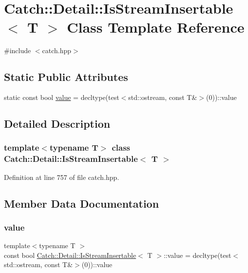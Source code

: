 \hypertarget{class_catch_1_1_detail_1_1_is_stream_insertable}{}\section{Catch\+:\+:Detail\+:\+:Is\+Stream\+Insertable$<$ T $>$ Class Template Reference}
\label{class_catch_1_1_detail_1_1_is_stream_insertable}


{\ttfamily \#include $<$catch.\+hpp$>$}

\subsection*{Static Public Attributes}
\begin{DoxyCompactItemize}
\item 
static const bool \mbox{\hyperlink{class_catch_1_1_detail_1_1_is_stream_insertable_a42818b09ae5851126a70ee263769e309}{value}} = decltype(test$<$std\+::ostream, const T\&$>$(0))\+::value
\end{DoxyCompactItemize}


\subsection{Detailed Description}
\subsubsection*{template$<$typename T$>$\newline
class Catch\+::\+Detail\+::\+Is\+Stream\+Insertable$<$ T $>$}



Definition at line 757 of file catch.\+hpp.



\subsection{Member Data Documentation}
\mbox{\label{class_catch_1_1_detail_1_1_is_stream_insertable_a42818b09ae5851126a70ee263769e309}} 
\subsubsection{\texorpdfstring{value}{value}}
{\footnotesize\ttfamily template$<$typename T $>$ \\
const bool \mbox{\hyperlink{class_catch_1_1_detail_1_1_is_stream_insertable}{Catch\+::\+Detail\+::\+Is\+Stream\+Insertable}}$<$ T $>$\+::value = decltype(test$<$std\+::ostream, const T\&$>$(0))\+::value\hspace{0.3cm}{\ttfamily [static]}}



